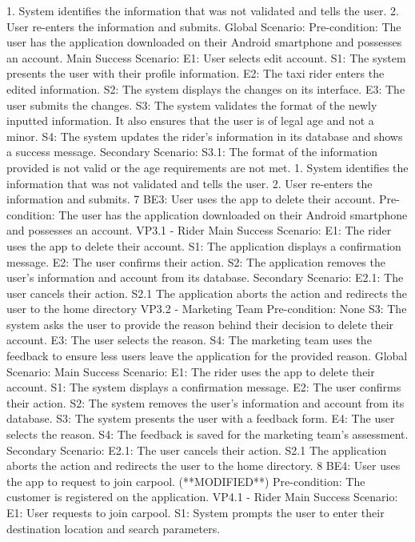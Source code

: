 1. System identifies the information that was not validated and tells the user.
2. User re-enters the information and submits.
Global Scenario:
Pre-condition: The user has the application downloaded on their Android smartphone and possesses
an account.
Main Success Scenario:
E1: User selects edit account.
S1: The system presents the user with their profile information.
E2: The taxi rider enters the edited information.
S2: The system displays the changes on its interface.
E3: The user submits the changes.
S3: The system validates the format of the newly inputted information. It also ensures that the
user is of legal age and not a minor.
S4: The system updates the rider’s information in its database and shows a success message.
Secondary Scenario:
S3.1: The format of the information provided is not valid or the age requirements are not met.
1. System identifies the information that was not validated and tells the user.
2. User re-enters the information and submits.
7
BE3: User uses the app to delete their account.
Pre-condition: The user has the application downloaded on their Android smartphone and possesses
an account.
VP3.1 - Rider
Main Success Scenario:
E1: The rider uses the app to delete their account.
S1: The application displays a confirmation message.
E2: The user confirms their action.
S2: The application removes the user’s information and account from its database.
Secondary Scenario:
E2.1: The user cancels their action.
S2.1 The application aborts the action and redirects the user to the home directory
VP3.2 - Marketing Team
Pre-condition: None
S3: The system asks the user to provide the reason behind their decision to delete their account.
E3: The user selects the reason.
S4: The marketing team uses the feedback to ensure less users leave the application for the provided
reason.
Global Scenario:
Main Success Scenario:
E1: The rider uses the app to delete their account.
S1: The system displays a confirmation message.
E2: The user confirms their action.
S2: The system removes the user’s information and account from its database.
S3: The system presents the user with a feedback form.
E4: The user selects the reason.
S4: The feedback is saved for the marketing team’s assessment.
Secondary Scenario:
E2.1: The user cancels their action.
S2.1 The application aborts the action and redirects the user to the home directory.
8
BE4: User uses the app to request to join carpool. (**MODIFIED**)
Pre-condition: The customer is registered on the application.
VP4.1 - Rider
Main Success Scenario:
E1: User requests to join carpool.
S1: System prompts the user to enter their destination location and search parameters.
